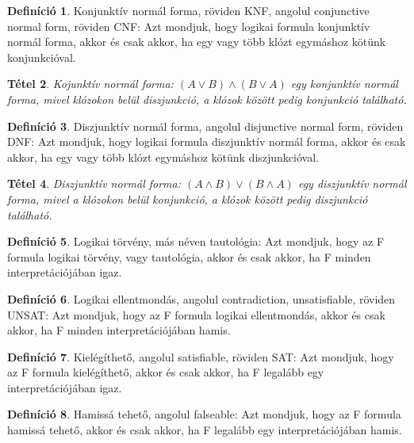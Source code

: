 \documentclass[
]{thesis-ekf}
\newtheorem{tetel}{Tétel}[chapter]
\theoremstyle{definition}
\newtheorem{definicio}[tetel]{Definíció}
\theoremstyle{remark}
\begin{document}
	\begin{definicio}\label{def-cnf}
		Konjunktív normál forma, röviden \textsc{KNF}, angolul conjunctive normal form, röviden \textsc{CNF}: Azt mondjuk, hogy logikai formula konjunktív normál forma, akkor és csak akkor, ha egy vagy több klózt egymáshoz kötünk konjunkcióval.
	\end{definicio}

	\begin{tetel}
		Kojunktív normál forma: $ (A\vee B)\wedge(B\vee A) $ egy konjunktív normál forma, mivel klózokon belül diszjunkció, a klózok között pedig konjunkció található.
	\end{tetel}

	\begin{definicio}\label{def-dnf}
		Diszjunktív normál forma, angolul disjunctive normal form, röviden \textsc{DNF}: Azt mondjuk, hogy logikai formula diszjunktív normál forma, akkor és csak akkor, ha egy vagy több klózt egymáshoz kötünk diszjunkcióval.
	\end{definicio}

	\begin{tetel}
		Diszjunktív normál forma: $ (A\wedge B)\vee(B\wedge A) $ egy diszjunktív normál forma, mivel a klózokon belül konjunkció, a klózok között pedig diszjunkció található.
	\end{tetel}

	\begin{definicio}\label{def-tautologia}
		Logikai törvény, más néven tautológia: Azt mondjuk, hogy az F formula logikai törvény, vagy tautológia, akkor és csak akkor, ha F minden interpretációjában igaz.
	\end{definicio}

	\begin{definicio}
		Logikai ellentmondás, angolul contradiction, unsatisfiable, röviden UNSAT: Azt mondjuk, hogy az F formula logikai ellentmondás, akkor és csak akkor, ha F minden interpretációjában hamis.
	\end{definicio}

	\begin{definicio}
		Kielégíthető, angolul satisfiable, röviden \textsc{SAT}: Azt mondjuk, hogy az F formula kielégíthető, akkor és csak akkor, ha F legalább egy interpretációjában igaz.
	\end{definicio}

	\begin{definicio}
		Hamissá tehető, angolul falseable: Azt mondjuk, hogy az F formula hamissá tehető, akkor és csak akkor, ha F legalább egy interpretációjában hamis. 
	\end{definicio}
\end{document}
